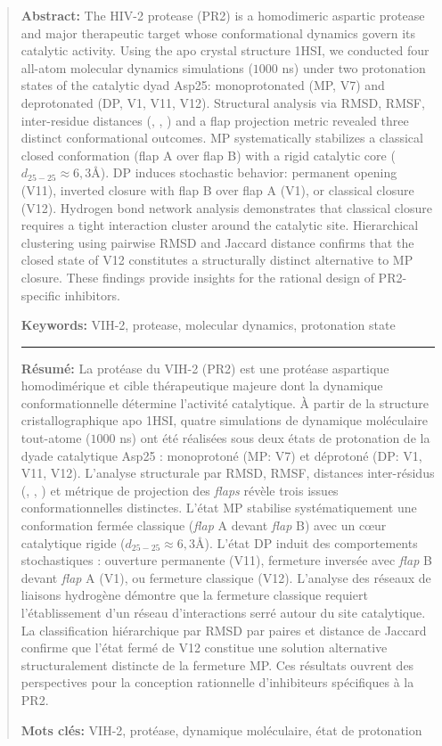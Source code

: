 \documentclass{isddmaster}
\begin{document}
	\Entete
	\medskip
	\begin{abstract}
		{\small \textbf{Abstract:} The HIV-2 protease (PR2) is a homodimeric aspartic protease and major therapeutic target whose conformational dynamics govern its catalytic activity. Using the apo crystal structure 1HSI, we conducted four all-atom molecular dynamics simulations ($1000$ ns) under two protonation states of the catalytic dyad Asp25: monoprotonated (MP, V7) and deprotonated (DP, V1, V11, V12). Structural analysis via RMSD, RMSF, inter-residue distances (, , ) and a flap projection metric revealed three distinct conformational outcomes. MP systematically stabilizes a classical closed conformation (flap A over flap B) with a rigid catalytic core ($d_{25-25}\approx6,3$\AA). DP induces stochastic behavior: permanent opening (V11), inverted closure with flap B over flap A (V1), or classical closure (V12). Hydrogen bond network analysis demonstrates that classical closure requires a tight interaction cluster around the catalytic site. Hierarchical clustering using pairwise RMSD and Jaccard distance confirms that the closed state of V12 constitutes a structurally distinct alternative to MP closure. These findings provide insights for the rational design of PR2-specific inhibitors.
		
		\textbf{Keywords:} VIH-2, protease, molecular dynamics, protonation state}
		\medskip
		\hrule
		\medskip
		{\small \textbf{Résumé:} La protéase du VIH-2 (PR2) est une protéase aspartique homodimérique et cible thérapeutique majeure dont la dynamique conformationnelle détermine l'activité catalytique. À partir de la structure cristallographique apo 1HSI, quatre simulations de dynamique moléculaire tout-atome ($1000$ ns) ont été réalisées sous deux états de protonation de la dyade catalytique Asp25 : monoprotoné (MP: V7) et déprotoné (DP: V1, V11, V12). L'analyse structurale par RMSD, RMSF, distances inter-résidus (, , ) et métrique de projection des \textit{flaps} révèle trois issues conformationnelles distinctes. L'état MP stabilise systématiquement une conformation fermée classique (\textit{flap} A devant \textit{flap} B) avec un cœur catalytique rigide ($d_{25-25}\approx6,3$\AA). L'état DP induit des comportements stochastiques : ouverture permanente (V11), fermeture inversée avec \textit{flap} B devant \textit{flap} A (V1), ou fermeture classique (V12). L'analyse des réseaux de liaisons hydrogène démontre que la fermeture classique requiert l'établissement d'un réseau d'interactions serré autour du site catalytique. La classification hiérarchique par RMSD par paires et distance de Jaccard confirme que l'état fermé de V12 constitue une solution alternative structuralement distincte de la fermeture MP. Ces résultats ouvrent des perspectives pour la conception rationnelle d'inhibiteurs spécifiques à la PR2.
		
		\textbf{Mots clés:} VIH-2, protéase, dynamique moléculaire, état de protonation}
	\end{abstract}
	
\end{document}
